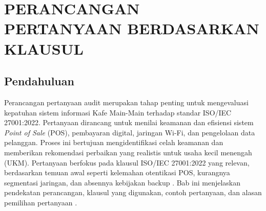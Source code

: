 \documentclass[12pt, a4paper]{report}
\begin{document}




\chapter{PERANCANGAN PERTANYAAN BERDASARKAN KLAUSUL}
\label{bab:pertanyaan}

\section{Pendahuluan}
Perancangan pertanyaan audit merupakan tahap penting untuk mengevaluasi kepatuhan sistem informasi Kafe Main-Main terhadap standar ISO/IEC 27001:2022. Pertanyaan dirancang untuk menilai keamanan dan efisiensi sistem \textit{Point of Sale} (POS), pembayaran digital, jaringan Wi-Fi, dan pengelolaan data pelanggan. Proses ini bertujuan mengidentifikasi celah keamanan dan memberikan rekomendasi perbaikan yang realistis untuk usaha kecil menengah (UKM). Pertanyaan berfokus pada klausul ISO/IEC 27001:2022 yang relevan, berdasarkan temuan awal seperti kelemahan otentikasi POS, kurangnya segmentasi jaringan, dan absennya kebijakan backup \citep{auditkafe2025, laporanaudit}. Bab ini menjelaskan pendekatan perancangan, klausul yang digunakan, contoh pertanyaan, dan alasan pemilihan pertanyaan \citep{iso27001, frangky2024implementasi}.
\end{document}
